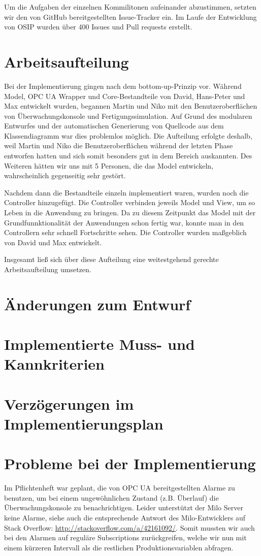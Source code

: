 \documentclass[parskip=full]{scrartcl}
\begin{document}
Um die Aufgaben der einzelnen Kommilitonen aufeinander abzustimmen, setzten wir den von GitHub bereitgestellten Issue-Tracker ein. Im Laufe der
Entwicklung von OSIP wurden über 400 Issues und Pull requests erstellt.

\section{Arbeitsaufteilung}
Bei der Implementierung gingen nach dem bottom-up-Prinzip vor. Während Model, OPC UA Wrapper und Core-Bestandteile von David, Hans-Peter und Max entwickelt wurden,
begannen Martin und Niko mit den Benutzeroberflächen von Überwachungskonsole und Fertigungssimulation. Auf Grund des modularen Entwurfes
und der automatischen Generierung von Quellcode aus dem Klassendiagramm war dies problemlos möglich. Die Aufteilung erfolgte deshalb, weil Martin und Niko die
Benutzeroberflächen während der letzten Phase entworfen hatten und sich somit besonders gut in dem Bereich auskannten. Des Weiteren hätten wir uns mit 5 Personen,
die das Model entwickeln, wahrscheinlich gegenseitig sehr gestört.

Nachdem dann die Bestandteile einzeln implementiert waren, wurden noch die Controller hinzugefügt. Die Controller verbinden jeweils Model und View,
um so Leben in die Anwendung zu bringen. Da zu diesem Zeitpunkt das Model mit der Grundfunnktionalität der Anwendungen schon fertig war,
konnte man in den Controllern sehr schnell Fortschritte sehen. Die Controller wurden maßgeblich von David und Max entwickelt.

Insgesamt ließ sich über diese Aufteilung eine weitestgehend gerechte Arbeitsaufteilung umsetzen.

\section{Änderungen zum Entwurf}


\section{Implementierte Muss- und Kannkriterien}


\section{Verzögerungen im Implementierungsplan}


\section{Probleme bei der Implementierung}
Im Pflichtenheft war geplant, die von OPC UA bereitgestellten Alarme zu benutzen, um bei einem ungewöhnlichen Zustand (z.B. Überlauf)
die Überwachungskonsole zu benachrichtigen. Leider unterstützt der Milo Server keine Alarme, siehe auch die entsprechende Antwort
des Milo-Entwicklers auf Stack Overflow: \href{http://stackoverflow.com/a/42161092/}{http://stackoverflow.com/a/42161092/}.
Somit mussten wir auch bei den Alarmen auf reguläre Subscriptions zurückgreifen, welche wir nun mit einem kürzeren Intervall
als die restlichen Produktionsvariablen abfragen.
\end{document}
